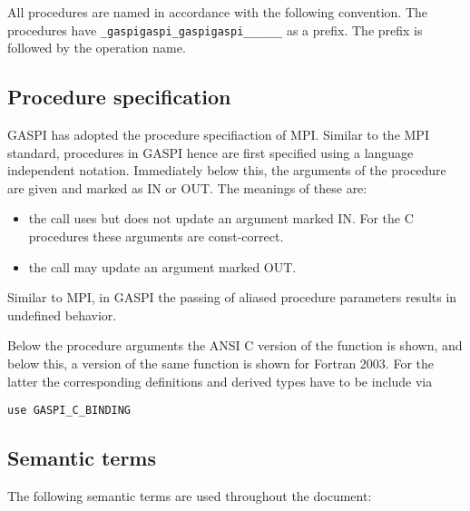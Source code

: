 \documentclass[a4paper]{article}
\makeatletter
\newlength{\st}\setlength{\st}{0pt}
\newcommand{\zerowsep}{\hskip 0pt plus 0.1pt minus 0.1pt}
\newcommand{\ZSEP}[1]{\ifx#1\@@@EOZ@@@\let\next\relax\else\ifx#1\_#1\zerowsep\else#1\fi\let\next\ZSEP\fi\next}
\newcommand{\zsep}[1]{\ZSEP{}#1\@@@EOZ@@@}
\newcommand{\gaspiprefix}{gaspi}
\newcommand{\function}[1]{{\tt #1}}
\newcommand{\gaspifunction}[1]{\function{\protect\zsep{\gaspiprefix\_#1}}}
\newenvironment{cbox}[1]
{\newcommand\colboxcolor{#1}\begin{lrbox}{\riddlebox}\begin{minipage}{\dimexpr\columnwidth-2\fboxsep\relax}}
{\end{minipage}\end{lrbox}\begin{center}\colorbox[HTML]{\colboxcolor}{\usebox{\riddlebox}}\end{center}}
\newenvironment{FDefSign}{\begin{cbox}{EEEEEE}}{\end{cbox}}
\makeatother
\begin{document}
All procedures are named in accordance with the following convention.
The procedures have \gaspifunction{} as a prefix. The prefix is
followed by the operation name.

\subsection{Procedure specification}

GASPI has adopted the procedure specifiaction of MPI. Similar to the
MPI standard, procedures in GASPI hence are first specified using a
language independent notation.  Immediately below this, the arguments
of the procedure are given and marked as IN or OUT. The meanings of
these are:

\begin{itemize}
\item the call uses but does not update an argument marked IN. For the C procedures these arguments are const-correct.
\item the call may update an argument marked OUT.
\end{itemize}

Similar to MPI, in GASPI the passing of aliased procedure parameters
results in undefined behavior.

Below the procedure arguments the ANSI C version of the function is
shown, and below this, a version of the same function is shown for
Fortran 2003. For the latter the corresponding definitions and derived
types have to be include via

\begin{FDefSign}
\begin{verbatim}
use GASPI_C_BINDING
\end{verbatim}
\end{FDefSign}



\subsection{Semantic terms}

The following semantic terms are used throughout the document:

\newcommand{\septext}{0.5em}
\newcommand{\gentextwithline}[6]{
\draw (#2,#3) node[left] {#1};
\draw[#6] (#2+\septext+#4,#3) -- +(#5,0);
}
\newcommand{\timeline}[1]{\gentextwithline{Time}{0}{#1}{0}{25em}{->,dashed}}
\newcommand{\operation}[2]{\gentextwithline{Operation}{0}{#1}{1em}{#2}{|-|}}
\newcommand{\gencall}[3]{\gentextwithline{#1}{0}{#2}{0}{#3}{|-|}}
\newcommand{\call}[2]{\gencall{Call}{#1}{#2}}
\newcommand{\calls}[2]{\gencall{Calls}{#1}{#2-10em};
\draw[|-|] (#2-8em,#1) -- +(8em,0);
}
\newcommand{\wait}[3]{\gentextwithline{Wait}{#1}{#2}{0}{#3}{|-|}}
\newcommand{\progress}[2]{\gentextwithline{Progress}{0}{#1}{1em}{#2}{|-|}}
\end{document}
